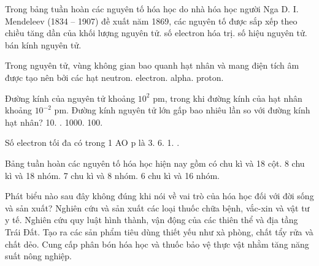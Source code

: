 \documentclass[11pt,a4paper]{article}
\begin{document}
\begin{ex}
Trong bảng tuần hoàn các nguyên tố hóa học do nhà hóa học người Nga D. I. Mendeleev (1834 -- 1907) đề xuất năm 1869, các nguyên tố được sắp xếp theo chiều tăng dần của
\choice
{\True khối lượng nguyên tử.}
{số electron hóa trị.}
{số hiệu nguyên tử.}
{bán kính nguyên tử.}

\end{ex}
\begin{ex}
Trong nguyên tử, vùng không gian bao quanh hạt nhân và mang điện tích âm được tạo nên bởi các hạt
\choice
{neutron.}
{\True electron.}
{alpha.}
{proton.}

\end{ex}
\begin{ex}
Đường kính của nguyên tử khoảng $10^2\text{ pm}$, trong khi đường kính của hạt nhân khoảng $10^{-2}\text{ pm}$. Đường kính nguyên tử lớn gấp bao nhiêu lần so với đường kính hạt nhân?
\choice
{10.}
{.}
{1000.}
{100.}

\end{ex}
\begin{ex}
Số electron tối đa có trong 1 AO p là
\choice
{3.}
{6.}
{1.}
{.}

\end{ex}
\begin{ex}
Bảng tuần hoàn các nguyên tố hóa học hiện nay gồm có
\choice
{ chu kì và 18 cột.}
{8 chu kì và 18 nhóm.}
{7 chu kì và 8 nhóm.}
{6 chu kì và 16 nhóm.}

\end{ex}
\begin{ex}
Phát biểu nào sau đây không đúng khi nói về vai trò của hóa học đối với đời sống và sản xuất?
\choice
{Nghiên cứu và sản xuất các loại thuốc chữa bệnh, vắc-xin và vật tư y tế.}
{\True Nghiên cứu quy luật hình thành, vận động của các thiên thể và địa tầng Trái Đất.}
{Tạo ra các sản phẩm tiêu dùng thiết yếu như xà phòng, chất tẩy rửa và chất dẻo.}
{Cung cấp phân bón hóa học và thuốc bảo vệ thực vật nhằm tăng năng suất nông nghiệp.}

\end{ex}
\end{document}
